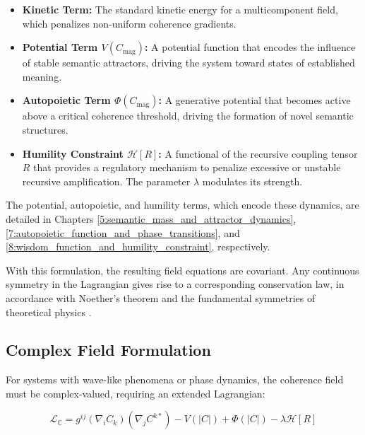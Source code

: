 \begin{itemize}

    \item \textbf{Kinetic Term:} The standard kinetic energy for a multicomponent field, which penalizes non-uniform coherence gradients.

    \item \textbf{Potential Term \(V(C_{\text{mag}})\):} A potential function that encodes the influence of stable semantic attractors, driving the system toward states of established meaning.

    \item \textbf{Autopoietic Term \(\Phi(C_{\text{mag}})\):} A generative potential that becomes active above a critical coherence threshold, driving the formation of novel semantic structures.

    \item \textbf{Humility Constraint \(\mathcal{H}[R]\):} A functional of the recursive coupling tensor \(R\) that provides a regulatory mechanism to penalize excessive or unstable recursive amplification. The parameter \(\lambda\) modulates its strength.

\end{itemize}

The potential, autopoietic, and humility terms, which encode these dynamics, are detailed in Chapters \ref{5:semantic_mass_and_attractor_dynamics}, \ref{7:autopoietic_function_and_phase_transitions}, and \ref{8:wisdom_function_and_humility_constraint}, respectively.

With this formulation, the resulting field equations are covariant. Any continuous symmetry in the Lagrangian gives rise to a corresponding conservation law, in accordance with Noether's theorem and the fundamental symmetries of theoretical physics \autocite{Noether1918, Lagrange1788, Euler1744, LandauLifshitz1975, PeskinSchroeder1995, Weinberg1995}.


\subsection{Complex Field Formulation}
\label{6.2.1:complex_field_formulation}

For systems with wave-like phenomena or phase dynamics, the coherence field must be complex-valued, requiring an extended Lagrangian:

\begin{equation}
\mathcal{L}_{\mathbb{C}} = g^{ij} (\nabla_i C_k)(\nabla_j C^{k*}) - V(|C|) + \Phi(|C|) - \lambda \mathcal{H}[R]
\end{equation}

